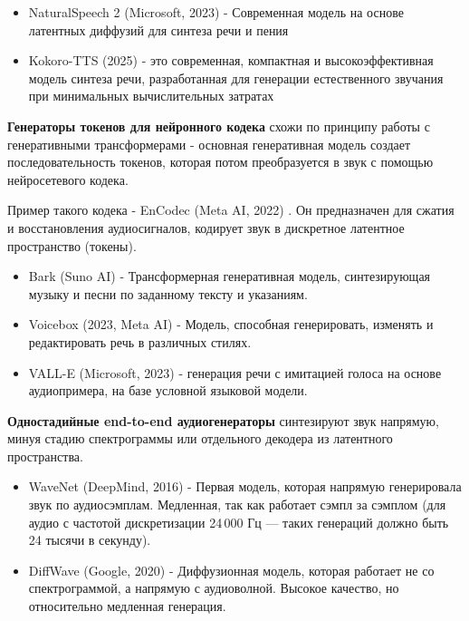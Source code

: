 \begin{itemize} 
  \item NaturalSpeech 2 (Microsoft, 2023) \cite{NaturalSpeech2} - Современная модель на основе латентных диффузий для синтеза речи и пения
  \item Kokoro-TTS (2025) \cite{kokoro}- это современная, компактная и высокоэффективная модель синтеза речи, разработанная для генерации естественного звучания при минимальных вычислительных затратах
\end{itemize}

\textbf{Генераторы токенов для нейронного кодека} схожи по принципу работы с генеративными трансформерами - основная генеративная модель создает последовательность токенов, 
которая потом преобразуется в звук с помощью нейросетевого кодека.

Пример такого кодека - EnCodec (Meta AI, 2022) \cite{encodec}. Он предназначен для сжатия и восстановления аудиосигналов, кодирует звук в дискретное латентное пространство (токены).

\begin{itemize} 
  \item Bark (Suno AI) \cite{SunoAI_Bark_2023} - Трансформерная генеративная модель, синтезирующая музыку и песни по заданному тексту и указаниям.
  \item Voicebox (2023, Meta AI) \cite{le2023voicebox} - Модель, способная генерировать, изменять и редактировать речь в различных стилях.
  \item VALL-E (Microsoft, 2023) \cite{Valle} - генерация речи с имитацией голоса на основе аудиопримера, на базе условной языковой модели.
\end{itemize}

\textbf{Одностадийные end-to-end аудиогенераторы} синтезируют звук напрямую, минуя стадию спектрограммы или отдельного декодера из латентного пространства.

\begin{itemize} 
  \item WaveNet (DeepMind, 2016) \cite{WaveNet} - Первая модель, которая напрямую генерировала звук по аудиосэмплам. Медленная, так как работает сэмпл за сэмплом (для аудио с частотой дискретизации 24 000 Гц — таких генераций должно быть 24 тысячи в секунду).
  \item DiffWave (Google, 2020) \cite{DiffWave} - Диффузионная модель, которая работает не со спектрограммой, а напрямую с аудиоволной. Высокое качество, но относительно медленная генерация.
\end{itemize}



